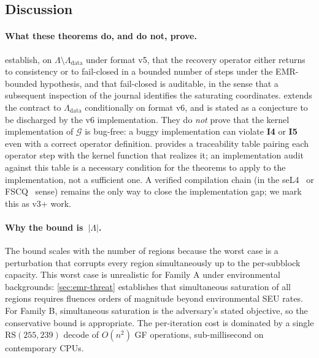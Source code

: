 \subsection{Discussion}

\paragraph{What these theorems do, and do not, prove.}
 establish, on
\(\Lambda \setminus \Lambda_{\mathrm{data}}\) under format v5, that
the recovery operator either returns to consistency or to
fail-closed in a bounded number of steps under the EMR-bounded
hypothesis, and that fail-closed is auditable, in the sense that
a subsequent inspection of the journal identifies the saturating
coordinates.  extends the contract to
\(\Lambda_{\mathrm{data}}\) conditionally on format v6, and is
stated as a conjecture to be discharged by the v6 implementation.
They do \emph{not} prove that the kernel implementation of
\(\mathcal{G}\) is bug-free: a buggy implementation can violate
\textbf{I4} or \textbf{I5} even with a correct operator
definition.  provides a traceability table pairing
each operator step with the kernel function that realizes it; an
implementation audit against this table is a necessary condition
for the theorems to apply to the implementation, not a sufficient
one. A verified compilation chain (in the seL4~\cite{klein2009sel4}
or FSCQ~\cite{chen2015fscq} sense) remains the only way to close
the implementation gap; we mark this as v3+ work.

\paragraph{Why the bound is~\(|\Lambda|\).}
The bound scales with the number of regions because the worst
case is a perturbation that corrupts every region simultaneously
up to the per-subblock capacity. This worst case is unrealistic
for Family A under environmental backgrounds: \cref{sec:emr-threat}
establishes that simultaneous saturation of all regions requires
fluences orders of magnitude beyond environmental SEU rates. For
Family B, simultaneous saturation is the adversary's stated
objective, so the conservative bound is appropriate. The
per-iteration cost is dominated by a single \(\mathrm{RS}(255,239)\)
decode of \(O(n^2)\) GF operations, sub-millisecond on
contemporary CPUs.

